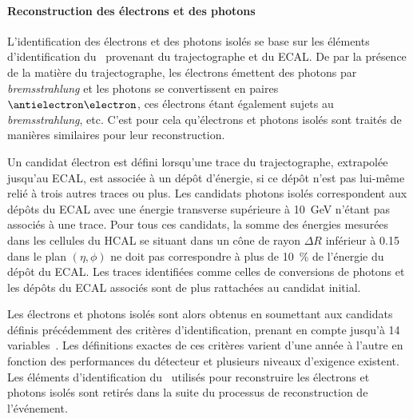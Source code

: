 \paragraph{Reconstruction des électrons et des photons}
L'identification des électrons et des photons isolés se base sur les éléments d'identification du \PF\ provenant du trajectographe et du ECAL.
De par la présence de la matière du trajectographe, les électrons émettent des photons par \emph{bremsstrahlung} et les photons se convertissent en paires $\antielectron\electron$, ces électrons étant également sujets au \emph{bremsstrahlung}, etc.
C'est pour cela qu'électrons et photons isolés sont traités de manières similaires pour leur reconstruction.
\par Un candidat électron est défini lorsqu'une trace du trajectographe, extrapolée jusqu'au ECAL, est associée à un dépôt d'énergie, si ce dépôt n'est pas lui-même relié à trois autres traces ou plus.
Les candidats photons isolés correspondent aux dépôts du ECAL avec une énergie transverse supérieure à \SI{10}{\GeV} n'étant pas associés à une trace.
Pour tous ces candidats, la somme des énergies mesurées dans les cellules du HCAL se situant dans un cône de rayon $\Delta R$ inférieur à \num{0.15} dans le plan $(\eta,\phi)$ ne doit pas correspondre à plus de \SI{10}{\%} de l'énergie du dépôt du ECAL.
Les traces identifiées comme celles de conversions de photons et les dépôts du ECAL associés sont de plus rattachées au candidat initial.
\par Les électrons et photons isolés sont alors obtenus en soumettant aux candidats définis précédemment des critères d'identification, prenant en compte jusqu'à 14 variables~\cite{particle-flow}.
Les définitions exactes de ces critères varient d'une année à l'autre en fonction des performances du détecteur et plusieurs niveaux d'exigence existent.
Les éléments d'identification du \PF\ utilisés pour reconstruire les électrons et photons isolés sont retirés dans la suite du processus de reconstruction de l'événement.
